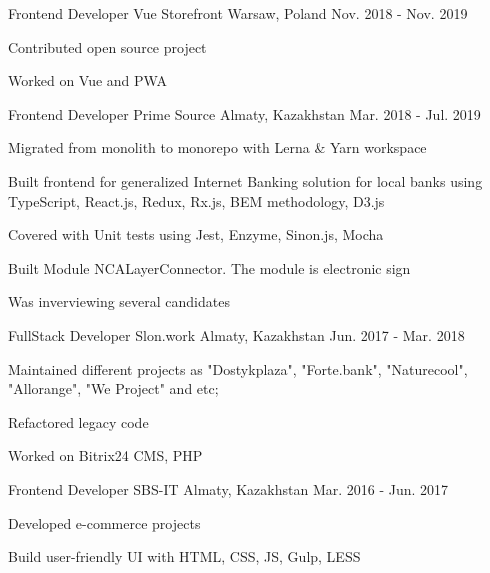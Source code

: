 \begin{cventries}
  \cventry
    {Frontend Developer} %
    {Vue Storefront} %
    {Warsaw, Poland} %
    {Nov. 2018 - Nov. 2019} %
    {
      \begin{cvitems} %
        \item {Contributed open source project}
        \item {Worked on Vue and PWA}
      \end{cvitems}
    }

  \cventry
    {Frontend Developer} %
    {Prime Source} %
    {Almaty, Kazakhstan} %
    {Mar. 2018 - Jul. 2019} %
    {
      \begin{cvitems} %
        \item {Migrated from monolith to monorepo with Lerna & Yarn workspace}
        \item {Built frontend for generalized Internet Banking solution for local banks using TypeScript, React.js, Redux, Rx.js, BEM methodology, D3.js}
        \item {Covered with Unit tests using Jest, Enzyme, Sinon.js, Mocha}
        \item {Built Module NCALayerConnector. The module is electronic sign}
        \item {Was inverviewing several candidates}
      \end{cvitems}
    }

  \cventry
    {FullStack Developer} %
    {Slon.work} %
    {Almaty, Kazakhstan} %
    {Jun. 2017 - Mar. 2018} %
    {
      \begin{cvitems} %
        \item {Maintained different projects as "Dostykplaza", "Forte.bank", "Naturecool", "Allorange", "We Project" and etc;}
        \item {Refactored legacy code}
        \item {Worked on Bitrix24 CMS, PHP}
      \end{cvitems}
    }

  \cventry
    {Frontend Developer} %
    {SBS-IT} %
    {Almaty, Kazakhstan} %
    {Mar. 2016 - Jun. 2017} %
    {
      \begin{cvitems} %
        \item {Developed e-commerce projects}
        \item {Build user-friendly UI with HTML, CSS, JS, Gulp, LESS}
      \end{cvitems}
    }


\end{cventries}
